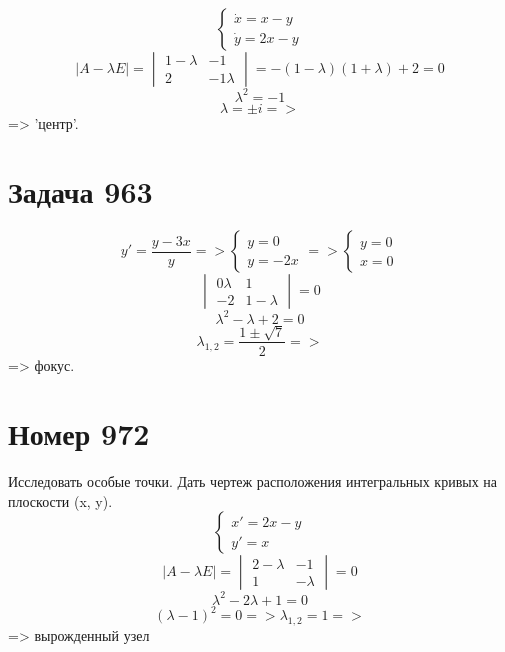 \begin{solution}
    $$\begin{cases}
            \dot{x} = x - y \\
            \dot{y} = 2x - y
        \end{cases}$$
    $$ |A - \lambda E| = \begin{vmatrix}
            1 - \lambda & -1         \\
            2           & -1 \lambda
        \end{vmatrix} = -(1 - \lambda)(1 + \lambda) + 2 = 0 $$
    $$ \lambda^2 = -1 $$
    $$ \lambda = \pm i => $$ => 'центр'.
\end{solution}

\section*{Задача 963}
\begin{solution}
    $$ y' = \dfrac{y - 3x}{y} => \begin{cases}
            y = 0 \\
            y = -2x
        \end{cases} => \begin{cases}
            y = 0 \\
            x = 0
        \end{cases}$$
    $$\begin{vmatrix}
            0 \lambda & 1           \\
            -2        & 1 - \lambda
        \end{vmatrix} = 0 $$
    $$ \lambda^2 - \lambda + 2 = 0 $$
    $$\lambda_{1, 2} = \dfrac{1 \pm \sqrt{7}}{2} => $$
    => фокус.
\end{solution}

\section*{Номер 972}
Исследовать особые точки. Дать чертеж расположения интегральных кривых на плоскости (x, y).
$$
    \begin{cases}
        x' = 2x - y \\
        y' = x
    \end{cases}
$$
$$ |A - \lambda E| = \begin{vmatrix}
        2 - \lambda & -1      \\
        1           & -\lambda
    \end{vmatrix}  = 0  $$
$$ \lambda^2 - 2\lambda + 1 = 0 $$
$$(\lambda - 1)^2 = 0 => \lambda_{1, 2} = 1 =>$$
=> вырожденный узел
